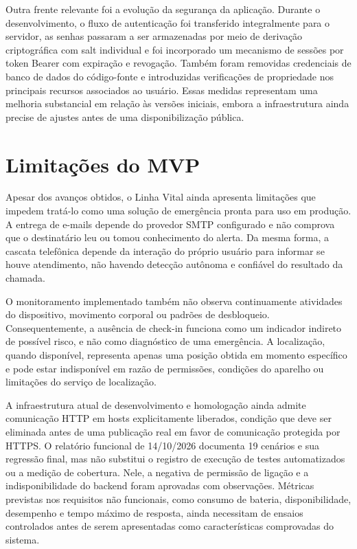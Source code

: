 Outra frente relevante foi a evolução da segurança da aplicação. Durante o desenvolvimento, o fluxo de autenticação foi transferido integralmente para o servidor, as senhas passaram a ser armazenadas por meio de derivação criptográfica com salt individual e foi incorporado um mecanismo de sessões por token Bearer com expiração e revogação. Também foram removidas credenciais de banco de dados do código-fonte e introduzidas verificações de propriedade nos principais recursos associados ao usuário. Essas medidas representam uma melhoria substancial em relação às versões iniciais, embora a infraestrutura ainda precise de ajustes antes de uma disponibilização pública.

\section{Limitações do MVP}

Apesar dos avanços obtidos, o Linha Vital ainda apresenta limitações que impedem tratá-lo como uma solução de emergência pronta para uso em produção. A entrega de e-mails depende do provedor SMTP configurado e não comprova que o destinatário leu ou tomou conhecimento do alerta. Da mesma forma, a cascata telefônica depende da interação do próprio usuário para informar se houve atendimento, não havendo detecção autônoma e confiável do resultado da chamada.

O monitoramento implementado também não observa continuamente atividades do dispositivo, movimento corporal ou padrões de desbloqueio. Consequentemente, a ausência de check-in funciona como um indicador indireto de possível risco, e não como diagnóstico de uma emergência. A localização, quando disponível, representa apenas uma posição obtida em momento específico e pode estar indisponível em razão de permissões, condições do aparelho ou limitações do serviço de localização.

A infraestrutura atual de desenvolvimento e homologação ainda admite comunicação HTTP em hosts explicitamente liberados, condição que deve ser eliminada antes de uma publicação real em favor de comunicação protegida por HTTPS. O relatório funcional de 14/10/2026 documenta 19 cenários e sua regressão final, mas não substitui o registro de execução de testes automatizados ou a medição de cobertura. Nele, a negativa de permissão de ligação e a indisponibilidade do backend foram aprovadas com observações. Métricas previstas nos requisitos não funcionais, como consumo de bateria, disponibilidade, desempenho e tempo máximo de resposta, ainda necessitam de ensaios controlados antes de serem apresentadas como características comprovadas do sistema.

